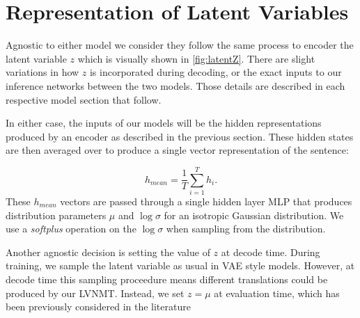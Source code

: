 \section{Representation of Latent Variables}

Agnostic to either model we consider they follow the same process to encoder the latent variable $z$ which is visually shown in \ref{fig:latentZ}. There are slight variations in how $z$ is incorporated during decoding, or the exact inputs to our inference networks between the two models. Those details are described in each respective model section that follow. 

In either case, the inputs of our models will be the hidden representations produced by an encoder as described in the previous section. These hidden states are then averaged over to produce a single vector representation of the sentence:

\begin{equation}
h_{mean} = \frac{1}{T} \sum_{i=1}^{T} h_{i}.
\end{equation}
These $h_{mean}$ vectors are passed through a single hidden layer \ac{MLP} that produces distribution parameters $\mu$ and $\log \sigma$ for an isotropic Gaussian distribution. We use a \textit{softplus} operation on the $\log\sigma$ when sampling from the distribution. 

Another agnostic decision is setting the value of $z$ at decode time. During training, we sample the latent variable as usual in VAE style models. However, at decode time this sampling proceedure means different translations could be produced by our \ac{LVNMT}. Instead, we set $z=\mu$ at evaluation time, which has been previously considered in the literature \cite{Zhang2016VNMT, eikema2018AEVNMT}


